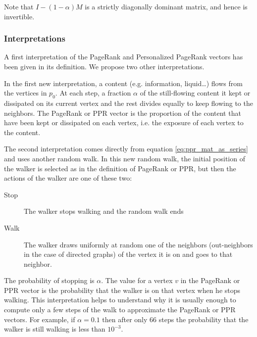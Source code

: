 Note that $I - (1-\alpha)M$ is a strictly diagonally dominant matrix, and hence is invertible.

\subsubsection{Interpretations}
A first interpretation of the PageRank and Personalized PageRank vectors has been given in its definition. We propose two other interpretations.

In the first new interpretation, a content (e.g. information, liquid\dots) flows from the vertices in $p_0$. At each step, a fraction $\alpha$ of the still-flowing content it kept or dissipated on its current vertex and the rest divides equally to keep flowing to the neighbors. The PageRank or PPR vector is the proportion of the content that have been kept or dissipated on each vertex, i.e. the exposure of each vertex to the content.

The second interpretation comes directly from equation \ref{eq:ppr_mat_as_series} and uses another random walk. In this new random walk, the initial position of the walker is selected as in the definition of PageRank or PPR, but then the actions of the walker are one of these two:
\begin{description}
    \item[Stop] The walker stops walking and the random walk ends
    \item[Walk] The walker draws uniformly at random one of the neighbors (out-neighbors in the case of directed graphs) of the vertex it is on and goes to that neighbor.
\end{description}

The probability of stopping is $\alpha$. The value for a vertex $v$ in the PageRank or PPR vector is the probability that the walker is on that vertex when he stops walking. This interpretation helps to understand why it is usually enough to compute only a few steps of the walk to approximate the PageRank or PPR vectors. For example, if $\alpha = 0.1$ then after only $66$ steps the probability that the walker is still walking is less than $10^{-3}$.

